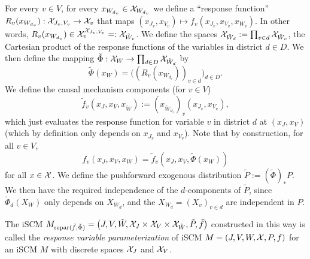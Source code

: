 For every $v \in V$, for every $x_{W_{d_v}} \in \mathcal{X}_{W_{d_v}}$ we define a ``response function'' $R_v(x_{W_{d_v}}) : \mathcal{X}_{J_v,V_v} \to \mathcal{X}_v$ that maps $(x_{J_v},x_{V_v}) \mapsto f_v(x_{J_v},x_{V_v},x_{W_v})$.
In other words, $R_v(x_{W_{d_v}}) \in \mathcal{X}_v^{\mathcal{X}_{J_v,V_v}} =: \mathcal{X}_{\tilde W_v}$.
We define the spaces $\mathcal{X}_{\tilde W_d} := \prod_{v \in d} \mathcal{X}_{\tilde W_v}$, the Cartesian product of the response functions of the variables in district $d \in D$.
We then define the mapping $\tilde\Phi : \mathcal{X}_W \to \prod_{d \in D} \mathcal{X}_{\tilde W_d}$ by
$$\tilde\Phi(x_W) = \big((R_v(x_{W_{d_v}}))_{v \in d}\big)_{d \in D}.$$ 
We define the causal mechanism components (for $v \in V$)
$$\tilde{f}_v(x_J,x_V,x_{\tilde{W}}) := (x_{\tilde W_{d_v}})_{v}(x_{J_v},x_{V_v}),$$
which just evaluates the response function for variable $v$ in district $d$ at $(x_J,x_V)$ (which by definition only depends on $x_{J_v}$ and $x_{V_v}$). 
Note that by construction, for all $v \in V$,
  $$f_v(x_J,x_V,x_W) = \tilde{f}_v(x_J,x_V,\tilde{\Phi}(x_W))$$
for all $x \in \mathcal{X}$.
We define the pushforward exogenous distribution $\tilde{P} := (\tilde\Phi)_* P$.
We then have the required independence of the $d$-components of $\tilde{P}$, since $\tilde\Phi_d(X_W)$ only depends on $X_{W_d}$, and the $X_{W_d} = (X_v)_{v\in d}$ are independent in $P$. 
\begin{Def}
The iSCM $M_{\mathrm{repar}({\tilde{f}},{\tilde\Phi})} = \left ( J, V, \tilde{W}, \mathcal{X}_J \times \mathcal{X}_V \times \mathcal{X}_{\tilde{W}}, \tilde{P}, \tilde{f} \right )$
constructed in this way is called the \emph{response variable parameterization} of iSCM $M = \left ( J, V, W, \mathcal{X}, P, f \right )$
for an iSCM $M$ with discrete spaces $\mathcal{X}_J$ and $\mathcal{X}_V$.
\end{Def}



